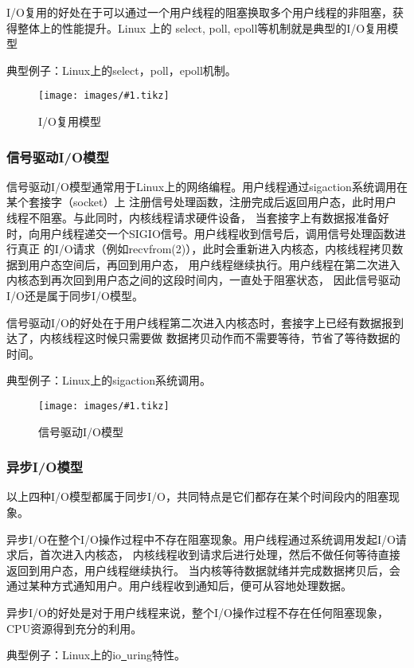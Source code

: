 \documentclass[supercite]{HustGraduPaper}
\newcommand{\cfig}[3]{
  \begin{figure}[htb]
    \centering
    \texttt{[image: images/\#1.tikz]}
    \caption{#3}
    \label{fig:#1}
  \end{figure}
}
\theoremstyle{definition}
\begin{document}
I/O复用的好处在于可以通过一个用户线程的阻塞换取多个用户线程的非阻塞，获得整体上的性能提升。Linux 上的
select, poll, epoll等机制就是典型的I/O复用模型\par

典型例子：Linux上的select，poll，epoll机制。\par

\cfig{io-multiplex}{0.7}{I/O复用模型}

\subsubsection{信号驱动I/O模型}
信号驱动I/O模型通常用于Linux上的网络编程。用户线程通过sigaction系统调用在某个套接字（socket）上
注册信号处理函数，注册完成后返回用户态，此时用户线程不阻塞。与此同时，内核线程请求硬件设备，
当套接字上有数据报准备好时，向用户线程递交一个SIGIO信号。用户线程收到信号后，调用信号处理函数进行真正
的I/O请求（例如recvfrom(2)），此时会重新进入内核态，内核线程拷贝数据到用户态空间后，再回到用户态，
用户线程继续执行。用户线程在第二次进入内核态到再次回到用户态之间的这段时间内，一直处于阻塞状态，
因此信号驱动I/O还是属于同步I/O模型。\par

信号驱动I/O的好处在于用户线程第二次进入内核态时，套接字上已经有数据报到达了，内核线程这时候只需要做
数据拷贝动作而不需要等待，节省了等待数据的时间。\par

典型例子：Linux上的sigaction系统调用。\par

\cfig{signal-driven}{0.7}{信号驱动I/O模型}

\subsubsection{异步I/O模型}
以上四种I/O模型都属于同步I/O，共同特点是它们都存在某个时间段内的阻塞现象。\par

异步I/O在整个I/O操作过程中不存在阻塞现象。用户线程通过系统调用发起I/O请求后，首次进入内核态，
内核线程收到请求后进行处理，然后不做任何等待直接返回到用户态，用户线程继续执行。
当内核等待数据就绪并完成数据拷贝后，会通过某种方式通知用户。用户线程收到通知后，便可从容地处理数据。\par

异步I/O的好处是对于用户线程来说，整个I/O操作过程不存在任何阻塞现象，CPU资源得到充分的利用。\par

典型例子：Linux上的io\underline{~}uring特性。\par
\end{document}
